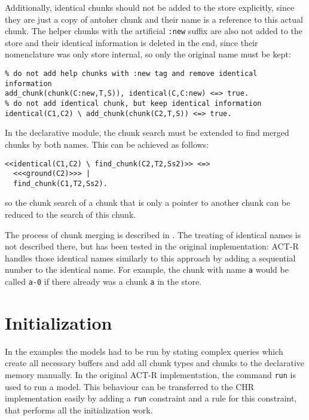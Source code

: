 Additionally, identical chunks should not be added to the store explicitly, since they are just a copy of antoher chunk and their name is a reference to this actual chunk. The helper chunks with the artificial \lstinline|:new| suffix are also not added to the store and their identical information is deleted in the end, since their nomenclature was only store internal, so only the original name must be kept:

\begin{lstlisting}
% do not add help chunks with :new tag and remove identical information
add_chunk(chunk(C:new,T,S)), identical(C,C:new) <=> true. 
% do not add identical chunk, but keep identical information
identical(C1,C2) \ add_chunk(chunk(C2,T,S)) <=> true. 
\end{lstlisting}

In the declarative module, the chunk search must be extended to find merged chunks by both names. This can be achieved as follows:

\begin{lstlisting}
<<identical(C1,C2) \ find_chunk(C2,T2,Ss2)>> <=> 
  <<<ground(C2)>>> | 
  find_chunk(C1,T2,Ss2).
\end{lstlisting}

so the chunk search of a chunk that is only a pointer to another chunk can be reduced to the search of this chunk. 

The process of chunk merging is described in \cite[??]{actr_reference}. The treating of identical names is not described there, but has been tested in the original implementation: ACT-R handles those identical names similarly to this approach by adding a sequential number to the identical name. For example, the chunk with name \lstinline|a| would be called \lstinline|a-0| if there already was a chunk \lstinline|a| in the store.

\section{Initialization}
\label{initialization}

In the examples the models had to be run by stating complex queries which create all necessary buffers and add all chunk types and chunks to the declarative memory manually. In the original ACT-R implementation, the command \lstinline|run| is used to run a model. This behaviour can be transferred to the CHR implementation easily by adding a \lstinline|run| constraint and a rule for this constraint, that performs all the initialization work.

